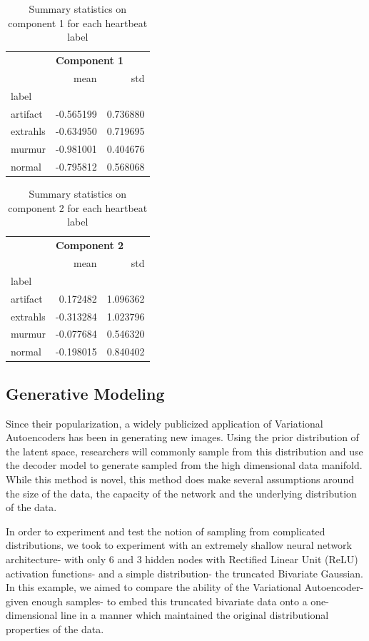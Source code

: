 \documentclass[12pt]{article}
\begin{document}
\begin{table}[h!]
\centering
\begin{tabular}{lrr}
{} & \multicolumn{2}{l}{\textbf{Component 1}} \\
{} &        mean &       std \\
label    &             &           \\
artifact &   -0.565199 &  0.736880 \\
extrahls &   -0.634950 &  0.719695 \\
murmur   &   -0.981001 &  0.404676 \\
normal   &   -0.795812 &  0.568068 \\
\end{tabular}
\caption{Summary statistics on component 1 for each heartbeat label}
\label{table:heartbeatcomponent1}
\end{table}

\begin{table}[h!]
\centering
\begin{tabular}{lrr}
{} & \multicolumn{2}{l}{\textbf{Component 2}} \\
{} &        mean &       std \\
label    &             &           \\
artifact &    0.172482 &  1.096362 \\
extrahls &   -0.313284 &  1.023796 \\
murmur   &   -0.077684 &  0.546320 \\
normal   &   -0.198015 &  0.840402 \\
\end{tabular}
\caption{Summary statistics on component 2 for each heartbeat label}
\label{table:heartbeatcomponent2}
\end{table}

\newpage
\subsection{Generative Modeling}
Since their popularization, a widely publicized application of Variational Autoencoders has been in generating new images.  Using the prior distribution of the latent space, researchers will commonly sample from this distribution and use the decoder model to generate sampled from the high dimensional data manifold. While this method is novel, this method does make several assumptions around the size of the data, the capacity of the network and the underlying distribution of the data.  
  
In order to experiment and test the notion of sampling from complicated distributions, we took to experiment with an extremely shallow neural network architecture- with only 6 and 3 hidden nodes with Rectified Linear Unit (ReLU) activation functions- and a simple distribution- the truncated Bivariate Gaussian. In this example, we aimed to compare the ability of the Variational Autoencoder- given enough samples- to embed this truncated bivariate data onto a one-dimensional line in a manner which maintained the original distributional properties of the data. 
  
\end{document}
